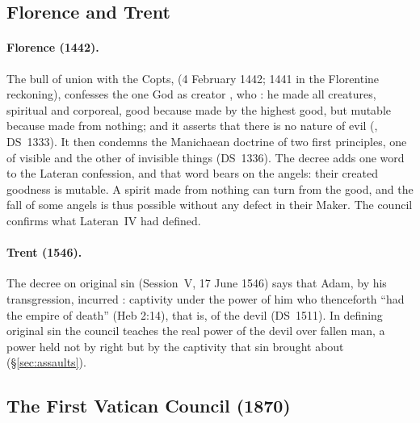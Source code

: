 \sectionguard
\subsection{Florence and Trent}

\paragraph{Florence (1442).} The bull of union with the Copts,
 (4 February 1442; 1441 in the Florentine reckoning),
confesses the one God as creator , who : he made all creatures, spiritual
and corporeal, good because made by the highest good, but mutable because
made from nothing; and it asserts that there is no nature of evil (, DS~1333). It then condemns the Manichaean doctrine of two first
principles, one of visible and the other of invisible things (DS~1336). The
decree adds one word to the Lateran confession, and that word bears on the
angels: their created goodness is mutable. A spirit made from nothing can
turn from the good, and the fall of some angels is thus possible without
any defect in their Maker. The council confirms what Lateran~IV had
defined.

\paragraph{Trent (1546).} The decree on original sin (Session~V, 17 June
1546) says that Adam, by his transgression, incurred : captivity under the power of him who thenceforth ``had the empire
of death'' (Heb 2:14), that is, of the devil (DS~1511). In defining
original sin the council teaches the real power of the devil over fallen
man, a power held not by right but by the captivity that sin brought about
(\S\ref{sec:assaults}).

\sectionguard
\subsection{The First Vatican Council (1870)}

